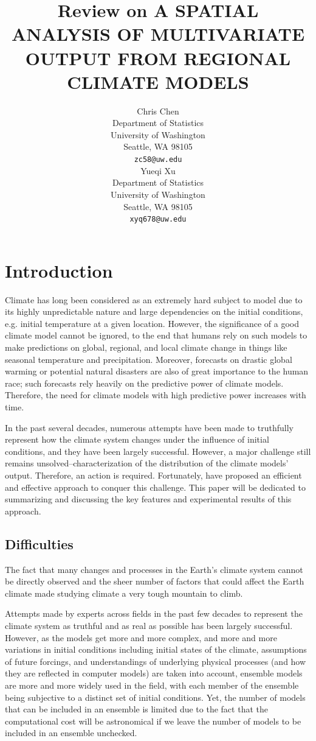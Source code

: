 \documentclass{article}
\title{Review on A SPATIAL ANALYSIS OF MULTIVARIATE OUTPUT FROM REGIONAL CLIMATE MODELS}
\author{
  Chris Chen \\
  Department of Statistics\\
  University of Washington\\
  Seattle, WA 98105 \\
  \texttt{zc58@uw.edu} \\
  \And
  Yueqi Xu \\
  Department of Statistics\\
  University of Washington\\
  Seattle, WA 98105 \\
  \texttt{xyq678@uw.edu} 
}
\begin{document}
\maketitle

\section{Introduction}
Climate has long been considered as an extremely hard subject to model due to its highly unpredictable nature and large dependencies on the initial conditions, e.g. initial temperature at a given location. However, the significance of a good climate model cannot be ignored, to the end that humans rely on such models to make predictions on global, regional, and local climate change in things like seasonal temperature and precipitation. Moreover, forecasts on drastic global warming or potential natural disasters are also of great importance to the human race; such forecasts rely heavily on the predictive power of climate models. Therefore, the need for climate models with high predictive power increases with time. 

In the past several decades, numerous attempts have been made to truthfully represent how the climate system changes under the influence of initial conditions, and they have been largely successful. However, a major challenge still remains unsolved--characterization of the distribution of the climate models' output. Therefore, an action is required. Fortunately, \cite{paper} have proposed an efficient and effective approach to conquer this challenge. This paper will be dedicated to summarizing and discussing the key features and experimental results of this approach. 

\subsection{Difficulties}
The fact that many changes and processes in the Earth's climate system cannot be directly observed and the sheer number of factors that could affect the Earth climate made studying climate a very tough mountain to climb. 

Attempts made by experts across fields in the past few decades to represent the climate system as truthful and as real as possible has been largely successful. However, as the models get more and more complex, and more and more variations in initial conditions including initial states of the climate, assumptions of future forcings, and understandings of underlying physical processes (and how they are reflected in computer models) are taken into account, ensemble models are more and more widely used in the field, with each member of the ensemble being subjective to a distinct set of initial conditions. Yet, the number of models that can be included in an ensemble is limited due to the fact that the computational cost will be astronomical if we leave the number of models to be included in an ensemble unchecked.
\end{document}
